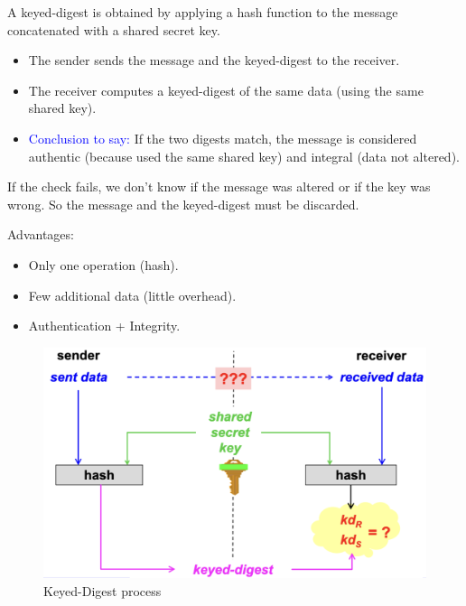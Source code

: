 \hfill

A keyed-digest is obtained by applying a hash function to the message concatenated with a shared secret key. 
\begin{itemize}
    \item The sender sends the message and the keyed-digest to the receiver. 
    \item The receiver computes a keyed-digest of the same data (using the same shared key). 
    \item \textcolor{Blue}{Conclusion to say: }If the two digests match, the message is considered authentic (because used the same shared key) and integral (data not altered).

\end{itemize}
\begin{tcolorbox}[colback=red!10!white, colframe=red!70!black, coltitle=white, title=Beware]
If the check fails, we don't know if the message was altered or if the key was wrong. So the message and the keyed-digest must be discarded.
\end{tcolorbox}

\begin{multicols}{2}
    \raggedcolumns
    Advantages:
    \begin{itemize}
        \item Only one operation (hash).
        \item Few additional data (little overhead).
        \item Authentication + Integrity.
    \end{itemize}
\columnbreak

\begin{figure}[H]
    \centering
    \includegraphics[width=\linewidth]{Images/Cryptography/keyed_digest.png}
    \caption{Keyed-Digest process}
\end{figure}
\end{multicols}

